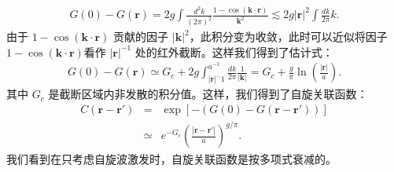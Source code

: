 \documentclass[10pt,UTF8]{ctexart}
\begin{document}
\begin{eqnarray}
	G(0)-G(\bm r) = 2g\int \frac{d^2 k}{(2\pi)^2} \frac{1-\cos(\bm k \cdot \bm r)}{\bm k^2}
	\lesssim 2g|\bm r|^2\int \frac{dk}{2\pi} k.
\end{eqnarray}
由于 $1-\cos(\bm k\cdot \bm r)$ 贡献的因子 $|\bm k|^2$，此积分变为收敛，此时可以近似将因子$1-\cos(\bm k\cdot \bm r)$看作 $|\bm r|^{-1}$ 处的红外截断。这样我们得到了估计式：
\begin{eqnarray}
	G(0)-G(\bm r) 
	\simeq G_c + 2g\int_{|\bm r|^-1}^{a^{-1}}\frac{dk}{2\pi} \frac{1}{|\bm k|} 
	= G_c + \frac{g}{\pi} \ln\left(\frac{|\bm r|}{a} \right).
\end{eqnarray}
其中 $G_c$ 是截断区域内非发散的积分值。这样，我们得到了自旋关联函数：
\begin{eqnarray}
	C(\bm r - \bm r') &=& \exp\left[-(G(0)-G(\bm r-\bm r'))\right] \nonumber \\
	&\simeq & e^{-G_c} \left(\frac{|\bm r-\bm r'|}{a} \right)^{g/\pi}.
\end{eqnarray}
我们看到在只考虑自旋波激发时，自旋关联函数是按多项式衰减的。
\end{document}
